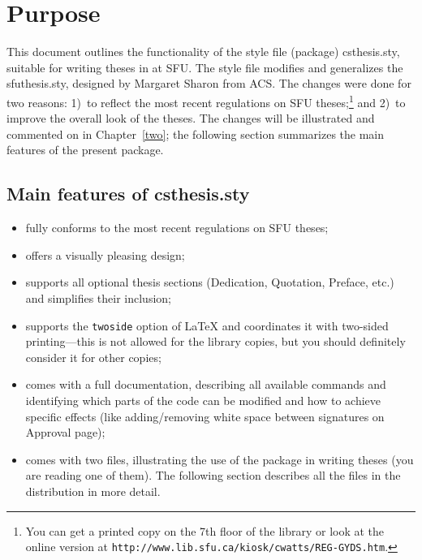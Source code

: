 
%
%

\chapter{Purpose}

This document outlines the functionality of the style file (package)
\textsf{csthesis.sty},
suitable for writing theses in \LaTeXe{} at SFU.  The style file
modifies and generalizes the
\textsf{sfuthesis.sty}, designed by
Margaret Sharon from ACS. The changes were done for two reasons: 1)~to
reflect the most recent regulations on SFU
theses;\footnote{You can get a printed copy on the 7th floor of the
  library or look at the online version at
  \texttt{http://www.lib.sfu.ca/kiosk/cwatts/REG-GYDS.htm}.}  and
2)~to improve the overall look of the theses. The changes will be
illustrated and commented on in Chapter~\ref{two}; the following
section summarizes the main features of the present package.


\section{Main features of \textsf{csthesis.sty}}

\begin{itemize}
\item fully conforms to the most recent regulations%
   on SFU theses;
\item offers a visually pleasing design;
\item supports all optional thesis sections
  (Dedication, Quotation, Preface, etc.) and simplifies their
  inclusion;
\item supports the \verb+twoside+%
   option of \LaTeX{}
  and coordinates it with two-sided printing---this is not allowed for the library copies, but you
  should definitely consider it for other copies;
\item comes with a full documentation, describing
  all available commands and identifying which parts of the code can
  be modified and how to achieve specific effects (like
  adding/removing white space between signatures on Approval page);
\item comes with two files, illustrating the use of the package in
  writing theses (you are reading one of them). The following section
  describes all the files in the distribution in more detail.
\end{itemize}

